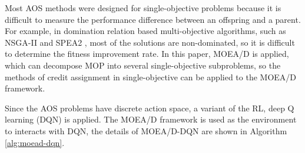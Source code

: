 \documentclass[journal]{IEEEtran}
\begin{document}
Most AOS methods were designed for single-objective problems because it is difficult to measure the performance difference between an offspring and a parent.
For example, in domination relation based multi-objective algorithms, such as NSGA-II \cite{nsga2} and SPEA2 \cite{spea2}, most of the solutions are non-dominated, so it is difficult to determine the fitness improvement rate.
In this paper, MOEA/D is applied, which can decompose MOP into several single-objective subproblems, so the methods of credit assignment in single-objective can be applied to the MOEA/D framework.

Since the AOS problems have discrete action space, a variant of the RL, deep Q learning (DQN) is applied.
The MOEA/D framework is used as the environment to interacts with DQN,
the details of MOEA/D-DQN are shown in Algorithm \ref{alg:moead-dqn}.
\end{document}
